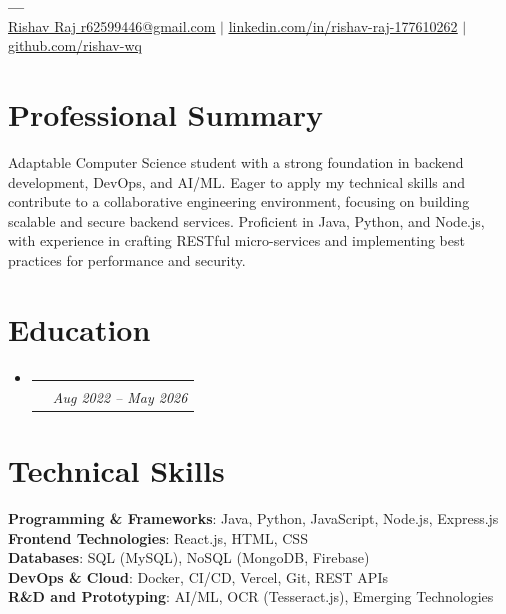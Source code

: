 \documentclass[letterpaper,10.5pt]{article}
\makeatletter
\newcommand{\resumeSubheading}[4]{
  \vspace{-2pt}\item
    \begin{tabular*}{0.97\textwidth}[t]{l@{\extracolsep{\fill}}r}
      \textbf{#1} & #2 \\
      \textit{\small#3} & \textit{\small #4} \\
    \end{tabular*}\vspace{-8pt}
}
\newcommand{\resumeSubHeadingListStart}{\begin{itemize}[leftmargin=0.15in, label={}]}
\newcommand{\resumeSubHeadingListEnd}{\end{itemize}}
\makeatother
\begin{document}
\begin{center}
    \textbf{\Huge \scshape ---} \\ \vspace{1pt}
    \href{mailto:Rishav Raj r62599446@gmail.com}{\underline{Rishav Raj r62599446@gmail.com}} $|$ \href{https://linkedin.com/in/rishav-raj-177610262}{\underline{linkedin.com/in/rishav-raj-177610262}} $|$ \href{https://github.com/rishav-wq}{\underline{github.com/rishav-wq}}
\end{center}

\section{Professional Summary}
Adaptable Computer Science student with a strong foundation in backend development, DevOps, and AI/ML. Eager to apply my technical skills and contribute to a collaborative engineering environment, focusing on building scalable and secure backend services. Proficient in Java, Python, and Node.js, with experience in crafting RESTful micro-services and implementing best practices for performance and security.

\section{Education}
  \resumeSubHeadingListStart
    \resumeSubheading
      {}{}
      {}{Aug 2022 – May 2026}
  \resumeSubHeadingListEnd
\vspace{2pt}

\section{Technical Skills}
 \begin{itemize}[leftmargin=0.15in, label={}]
    \small{\item{
     \textbf{Programming \& Frameworks}{: Java, Python, JavaScript, Node.js, Express.js} \\
     \textbf{Frontend Technologies}{: React.js, HTML, CSS} \\
     \textbf{Databases}{: SQL (MySQL), NoSQL (MongoDB, Firebase)} \\
     \textbf{DevOps \& Cloud}{: Docker, CI/CD, Vercel, Git, REST APIs} \\
     \textbf{R\&D and Prototyping}{: AI/ML, OCR (Tesseract.js), Emerging Technologies} \\
    }}
 \end{itemize}
\end{document}
